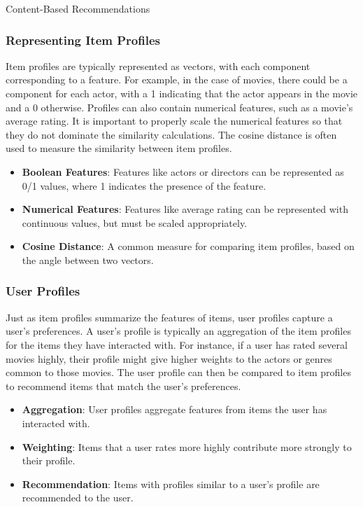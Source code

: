 \begin{notes}{Content-Based Recommendations}
    \subsubsection*{Representing Item Profiles}
    
    Item profiles are typically represented as vectors, with each component corresponding to a feature. For example, in the case of movies, there could be a component for each actor, with a 1 indicating that 
    the actor appears in the movie and a 0 otherwise. Profiles can also contain numerical features, such as a movie's average rating. It is important to properly scale the numerical features so that they do not 
    dominate the similarity calculations. The cosine distance is often used to measure the similarity between item profiles.
    
    \begin{highlight}
        \begin{itemize}
            \item \textbf{Boolean Features}: Features like actors or directors can be represented as 0/1 values, where 1 indicates the presence of the feature.
            \item \textbf{Numerical Features}: Features like average rating can be represented with continuous values, but must be scaled appropriately.
            \item \textbf{Cosine Distance}: A common measure for comparing item profiles, based on the angle between two vectors.
        \end{itemize}
    \end{highlight}
    
    \subsubsection*{User Profiles}
    
    Just as item profiles summarize the features of items, user profiles capture a user's preferences. A user's profile is typically an aggregation of the item profiles for the items they have interacted with. 
    For instance, if a user has rated several movies highly, their profile might give higher weights to the actors or genres common to those movies. The user profile can then be compared to item profiles to 
    recommend items that match the user's preferences.
    
    \begin{highlight}
        \begin{itemize}
            \item \textbf{Aggregation}: User profiles aggregate features from items the user has interacted with.
            \item \textbf{Weighting}: Items that a user rates more highly contribute more strongly to their profile.
            \item \textbf{Recommendation}: Items with profiles similar to a user's profile are recommended to the user.
        \end{itemize}
        \end{highlight}
    

\end{notes}
